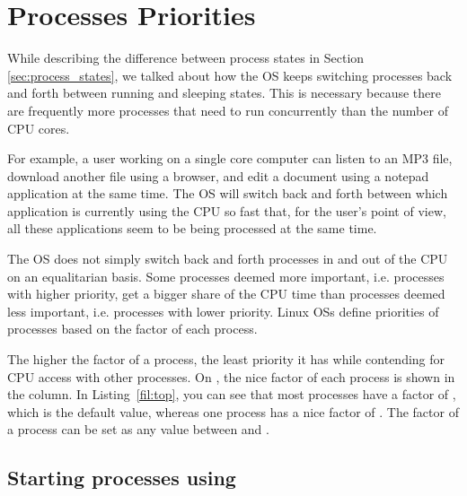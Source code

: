 \section{Processes Priorities}
\label{sec:nice}

While describing the difference between process states in Section \ref{sec:process_states}, we talked about how the \acs{OS} keeps switching processes back and forth between running and sleeping states. This is necessary because there are frequently more processes that need to run concurrently than the number of CPU cores.

For example, a user working on a single core computer can listen to an MP3 file, download another file using a browser, and edit a document using a notepad application at the same time. The \acs{OS} will switch back and forth between which application is currently using the CPU so fast that, for the user's point of view, all these applications seem to be being processed at the same time.

The \acs{OS} does not simply switch back and forth processes in and out of the CPU on an equalitarian basis. Some processes deemed more important, i.e. processes with higher priority, get a bigger share of the CPU time than processes deemed less important, i.e. processes with lower priority. Linux \acs{OS}s define priorities of processes based on the  factor of each process.

The higher the  factor of a process, the least priority it has while contending for CPU access with other processes. On , the nice factor of each process is shown in the  column. In Listing~\ref{fil:top}, you can see that most processes have a  factor of , which is the default value, whereas one process has a nice factor of . The  factor of a process can be set as any value between  and .

\subsection{Starting processes using }

